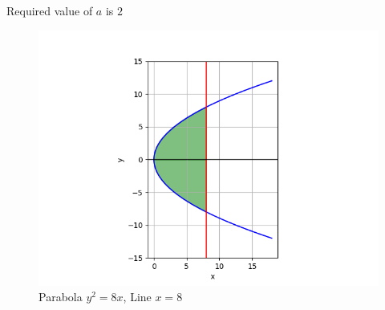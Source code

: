 \documentclass[journal]{IEEEtran}
\begin{document}
Required value of $a$ is $2$
\begin{figure}[h!]
   \centering
   \includegraphics[width = 1\linewidth]{figs/fig.png}
   \caption{Parabola $y^2=8x$, Line $x=8$}
   \label{stemplot}
\end{figure}
\end{document}
